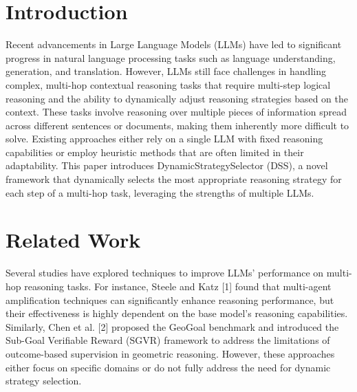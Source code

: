 \begin{abstract}
Large Language Models (LLMs) have shown remarkable capabilities in various natural language processing tasks. However, their performance on multi-hop contextual reasoning tasks remains challenging due to limitations in handling complex, multi-step logical reasoning and the dynamic nature of such tasks. This paper presents a novel framework, DynamicStrategySelector (DSS), that leverages the strengths of multiple LLMs and dynamically selects the most appropriate reasoning strategy at each step of a multi-hop task. By integrating LLMs with varying reasoning capabilities, DSS aims to enhance the overall performance and flexibility of LLMs in handling intricate reasoning tasks. We evaluate DSS on a range of benchmark datasets and demonstrate significant improvements in accuracy and efficiency compared to state-of-the-art methods.
\end{abstract}

\section{Introduction}
Recent advancements in Large Language Models (LLMs) have led to significant progress in natural language processing tasks such as language understanding, generation, and translation. However, LLMs still face challenges in handling complex, multi-hop contextual reasoning tasks that require multi-step logical reasoning and the ability to dynamically adjust reasoning strategies based on the context. These tasks involve reasoning over multiple pieces of information spread across different sentences or documents, making them inherently more difficult to solve. Existing approaches either rely on a single LLM with fixed reasoning capabilities or employ heuristic methods that are often limited in their adaptability. This paper introduces DynamicStrategySelector (DSS), a novel framework that dynamically selects the most appropriate reasoning strategy for each step of a multi-hop task, leveraging the strengths of multiple LLMs.

\section{Related Work}
Several studies have explored techniques to improve LLMs' performance on multi-hop reasoning tasks. For instance, Steele and Katz [1] found that multi-agent amplification techniques can significantly enhance reasoning performance, but their effectiveness is highly dependent on the base model's reasoning capabilities. Similarly, Chen et al. [2] proposed the GeoGoal benchmark and introduced the Sub-Goal Verifiable Reward (SGVR) framework to address the limitations of outcome-based supervision in geometric reasoning. However, these approaches either focus on specific domains or do not fully address the need for dynamic strategy selection.


